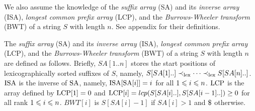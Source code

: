 We also assume the knowledge of the \textit{suffix array} (SA) and its \textit{inverse array} (ISA), \textit{longest common prefix array} (LCP), and the \textit{Burrows-Wheeler transform} (BWT) of a string $S$ with length $n$. See appendix for their definitions. 

\begin{toappendix}
The \textit{suffix array} (SA) and its \textit{inverse array} (ISA), \textit{longest common prefix array} (LCP), and the \textit{Burrows-Wheeler transform} (BWT) of a string $S$ with length $n$ are defined as follows. 
Briefly, $SA[1..n]$ stores the start positions of lexicographically sorted suffixes of $S$, namely, 
$S[SA[1]..] \prec_\lex \dots \prec_\lex S[SA[n]..]$. 
$\ISA$ is the inverse of $\SA$, namely, $\ISA[\SA[i]] = i$ for all $\btw i1n$.
$\LCP$ is the array defined by $\LCP[1] = 0$ and $\LCP[i] = lcp(S[SA[i]..], S[SA[i-1]..]) \ge 0$ for all rank $\btw i1n$. 
$BWT[i]$ is $S[SA[i]-1]$ if $SA[i]>1$ and $\daller$ otherwise.
\end{toappendix}






